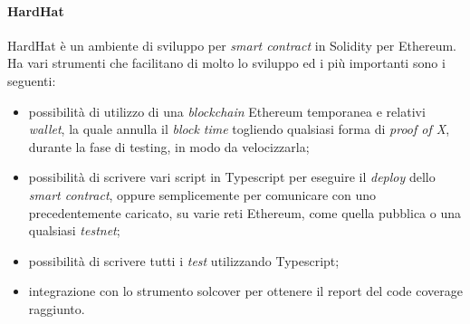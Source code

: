 


\paragraph{HardHat}
HardHat è un ambiente di sviluppo per \textit{smart contract} in Solidity per Ethereum. Ha vari strumenti che facilitano di molto lo sviluppo ed i più importanti sono i seguenti:
\begin{itemize}
  \item possibilità di utilizzo di una \textit{blockchain} Ethereum temporanea e relativi \textit{wallet}, la quale annulla il \textit{block time} togliendo qualsiasi forma di \textit{proof of X}, durante la fase di testing, in modo da velocizzarla;
  \item possibilità di scrivere vari script in Typescript per eseguire il \textit{deploy} dello \textit{smart contract}, oppure semplicemente per comunicare con uno precedentemente caricato, su varie reti Ethereum, come quella pubblica o una qualsiasi \textit{testnet};
  \item possibilità di scrivere tutti i \textit{test} utilizzando Typescript;
  \item integrazione con lo strumento solcover per ottenere il report del code coverage raggiunto.
\end{itemize}

